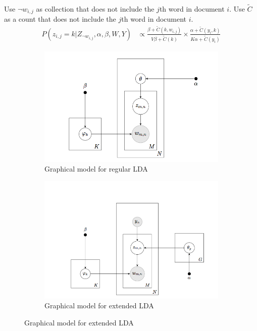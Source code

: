 ~\\ Use $\neg w_{i,j}$ as collection that does not include the $j$th word in document $i$. Use $\widetilde{C}$ as a count that does not include the $j$th word in document $i$.
\begin{align}
P(z_{i,j} = k | Z_{\neg w_{i,j}}, \alpha, \beta, W, Y) &\propto \frac{\beta + \widetilde{C}(k, w_{i,j})}{V\beta + \widetilde{C}(k)} \times \frac{\alpha + \widetilde{C}(y_i, k)}{K\alpha + \widetilde{C}(y_i)}
\end{align}


\begin{figure}[htp]
	\centering
	\begin{subfigure}[b]{0.5\textwidth}
		\includegraphics[width=\textwidth]{regular_lda_img}
		\caption{Graphical model for regular LDA}
		\label{fig:graphical-model}
	\end{subfigure}%
        \begin{subfigure}[b]{0.5\textwidth}
		\includegraphics[width=\textwidth]{extended_lda_img}
		\caption{Graphical model for extended LDA}
		\label{fig:graphical-model_extended}
	\end{subfigure}
\end{figure}

